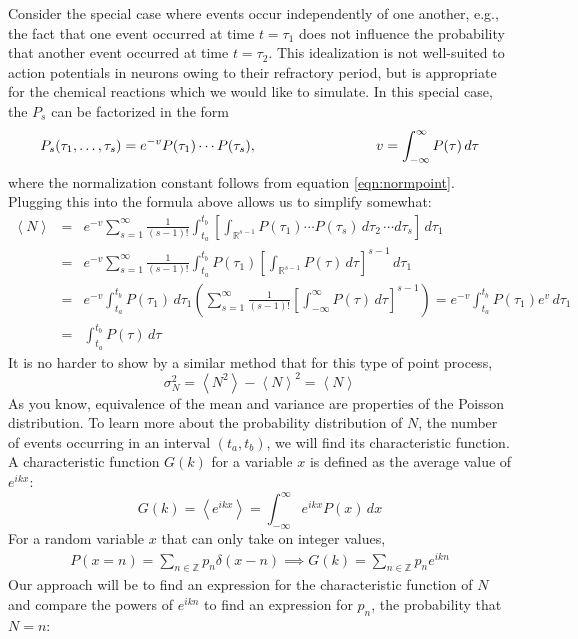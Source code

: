 \documentclass{article}
\begin{document}
Consider the special case where events occur independently of one another, e.g., the fact that one event occurred at time $t=\tau_1$ does not influence the probability that another event occurred at time $t=\tau_2$. This idealization is not well-suited to action potentials in neurons owing to their refractory period, but is appropriate for the chemical reactions which we would like to simulate. In this special case, the $P_s$ can be factorized in the form
\[ P_s(\tau_1,\ldots, \tau_s) = e^{-v} P(\tau_1) \cdots P(\tau_s), \hspace{3 cm}  v = \int_{-\infty}^{\infty} P(\tau) \, d\tau \]
where the normalization constant follows from equation \ref{eqn:normpoint}. Plugging this into the formula above allows us to simplify somewhat:
\begin{eqnarray}
\left< N \right>  & = & e^{-v} \sum_{s=1}^{\infty} \frac{1}{(s-1)!}  \int_{t_a}^{t_b}  \left[  \int_{\mathbb{R}^{s-1}}  P(\tau_1)\cdots P(\tau_s) \, d\tau_2 \, \cdots d\tau_s \right] \, d \tau_1 \nonumber \\
& = & e^{-v} \sum_{s=1}^{\infty} \frac{1}{(s-1)!}  \int_{t_a}^{t_b}  P(\tau_1) \left[  \int_{\mathbb{R}^{s-1}}  P(\tau) \, d\tau \right]^{s-1} \, d \tau_1 \nonumber \\
& = & e^{-v} \int_{t_a}^{t_b} P(\tau_1) \, d \tau_1 \left( \sum_{s=1}^{\infty} \frac{1}{(s-1)!}   \left[  \int_{-\infty}^{\infty} P(\tau) \, d\tau \right]^{s-1} \right) = e^{-v} \int_{t_a}^{t_b} P(\tau_1) e^v \, d \tau_1 \nonumber \\
& = & \int_{t_a}^{t_b} P(\tau) \, d \tau \label{eqn:avgpoisson}
\end{eqnarray}
It is no harder to show by a similar method that for this type of point process,
\[ \sigma_N^2 = \left< N^2 \right> - \left< N \right>^2 = \left< N \right> \]
As you know, equivalence of the mean and variance are properties of the Poisson distribution. To learn more about the probability distribution of $N$, the number of events occurring in an interval $(t_a,t_b)$, we will find its characteristic function. A characteristic function $G(k)$ for a variable $x$ is defined as the average value of $e^{ikx}$:
\[ G(k) =\left< e^{ikx} \right> = \int_{-\infty}^{\infty} e^{ikx} P(x)\, dx \]
For a random variable $x$ that can only take on integer values,
\begin{eqnarray}
 P(x=n) = \sum_{n \in \mathbb{Z}} p_n \delta(x-n) \implies G(k) = \sum_{n \in \mathbb{Z}} p_n e^{ikn} \label{eqn:discretechar}
 \end{eqnarray}
Our approach will be to find an expression for the characteristic function of $N$ and compare the powers of $e^{ikn}$ to find an expression for $p_n$, the probability that $N=n$:
\end{document}

